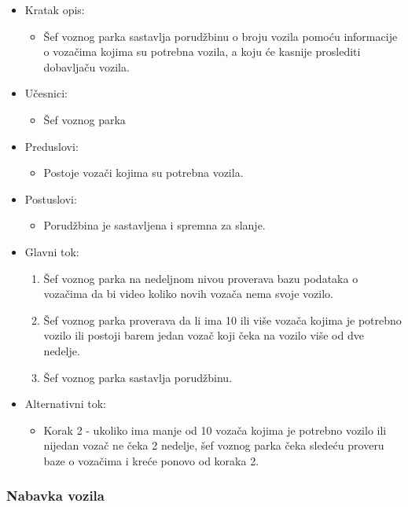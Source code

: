\begin{itemize}
	\item Kratak opis:
		\begin{itemize}
			\item Šef voznog parka sastavlja porudžbinu o broju vozila pomoću informacije o vozačima kojima su potrebna vozila, a koju će kasnije proslediti dobavljaču vozila.
		\end{itemize}
	\item Učesnici:
		\begin{itemize}
		    \item Šef voznog parka
		\end{itemize}
	\item Preduslovi:
		\begin{itemize}
		    \item Postoje vozači kojima su potrebna vozila.
		\end{itemize}
	\item Postuslovi:
		\begin{itemize}
			\item Porudžbina je sastavljena i spremna za slanje.
	\end{itemize}
	\item Glavni tok:
		\begin{enumerate}
		    \item Šef voznog parka na nedeljnom nivou proverava bazu podataka o vozačima da bi video koliko novih vozača nema svoje vozilo.
		    \item Šef voznog parka proverava da li ima 10 ili više vozača kojima je potrebno vozilo ili postoji barem jedan vozač koji čeka na vozilo više od dve nedelje.
		    \item Šef voznog parka sastavlja porudžbinu.
		\end{enumerate}
	\item Alternativni tok:
		\begin{itemize}
		    \item Korak 2 - ukoliko ima manje od 10 vozača kojima je potrebno vozilo ili nijedan vozač ne čeka 2 nedelje, šef voznog parka čeka sledeću proveru baze o vozačima i kreće ponovo od koraka 2.
		\end{itemize}
\end{itemize}


\subsubsection{\bfseries Nabavka vozila}

